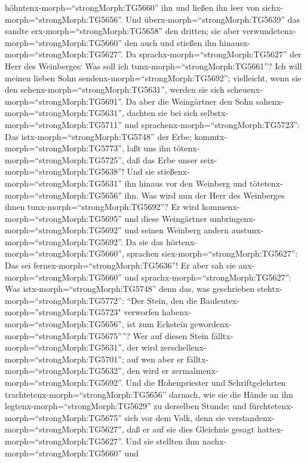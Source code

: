 höhntenx-morph=``strongMorph:TG5660'' ihn und ließen ihn leer von
sichx-morph=``strongMorph:TG5656''.  Und
überx-morph=``strongMorph:TG5639'' das sandte
erx-morph=``strongMorph:TG5658'' den dritten; sie aber
verwundetenx-morph=``strongMorph:TG5660'' den auch und stießen ihn
hinausx-morph=``strongMorph:TG5627''.  Da
sprachx-morph=``strongMorph:TG5627'' der Herr des Weinberges: Was soll
ich tunx-morph=``strongMorph:TG5661''? Ich will meinen lieben Sohn
sendenx-morph=``strongMorph:TG5692''; vielleicht, wenn sie den
sehenx-morph=``strongMorph:TG5631'', werden sie sich
scheuenx-morph=``strongMorph:TG5691''.  Da aber die
Weingärtner den Sohn sahenx-morph=``strongMorph:TG5631'', dachten sie
bei sich selbstx-morph=``strongMorph:TG5711'' und
sprachenx-morph=``strongMorph:TG5723'': Das
istx-morph=``strongMorph:TG5748'' der Erbe;
kommtx-morph=``strongMorph:TG5773'', laßt uns ihn
tötenx-morph=``strongMorph:TG5725'', daß das Erbe unser
seix-morph=``strongMorph:TG5638''!  Und sie
stießenx-morph=``strongMorph:TG5631'' ihn hinaus vor den Weinberg und
tötetenx-morph=``strongMorph:TG5656'' ihn. Was wird nun der Herr des
Weinberges ihnen tunx-morph=``strongMorph:TG5692''?  Er
wird kommenx-morph=``strongMorph:TG5695'' und diese Weingärtner
umbringenx-morph=``strongMorph:TG5692'' und seinen Weinberg andern
austunx-morph=``strongMorph:TG5692''. Da sie das
hörtenx-morph=``strongMorph:TG5660'', sprachen
siex-morph=``strongMorph:TG5627'': Das sei
fernex-morph=``strongMorph:TG5636''!  Er aber sah sie
anx-morph=``strongMorph:TG5660'' und
sprachx-morph=``strongMorph:TG5627'': Was
istx-morph=``strongMorph:TG5748'' denn das, was geschrieben
stehtx-morph=``strongMorph:TG5772'': ``Der Stein, den die
Bauleutex-morph=''strongMorph:TG5723" verworfen
habenx-morph=``strongMorph:TG5656'', ist zum Eckstein
gewordenx-morph=``strongMorph:TG5675''''?  Wer auf diesen
Stein fälltx-morph=``strongMorph:TG5631'', der wird
zerschellenx-morph=``strongMorph:TG5701''; auf wen aber er
fälltx-morph=``strongMorph:TG5632'', den wird er
zermalmenx-morph=``strongMorph:TG5692''.  Und die
Hohenpriester und Schriftgelehrten
trachtetenx-morph=``strongMorph:TG5656'' darnach, wie sie die Hände an
ihn legtenx-morph=``strongMorph:TG5629'' zu derselben Stunde; und
fürchtetenx-morph=``strongMorph:TG5675'' sich vor dem Volk, denn sie
verstandenx-morph=``strongMorph:TG5627'', daß er auf sie dies Gleichnis
gesagt hattex-morph=``strongMorph:TG5627''.  Und sie
stellten ihm nachx-morph=``strongMorph:TG5660'' und
